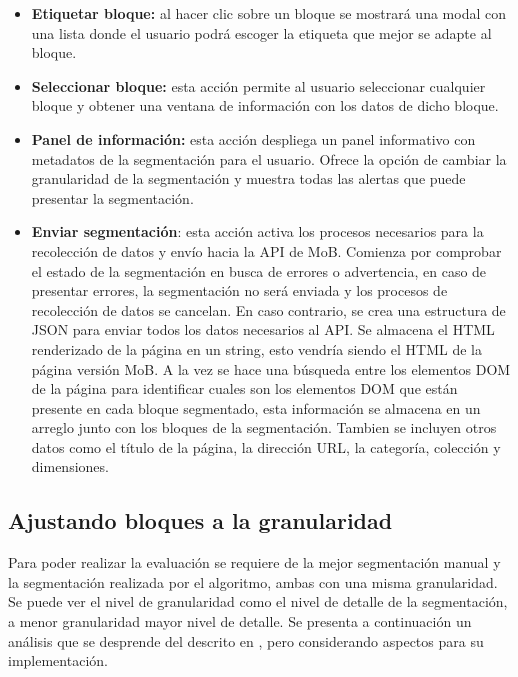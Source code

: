 \documentclass[10pt]{revecom}
\begin{document}
\begin{itemize}
\item \textbf{Etiquetar bloque:} al hacer clic sobre un bloque se mostrará una modal con una lista donde el usuario podrá escoger la etiqueta que mejor se adapte al bloque.
\item \textbf{Seleccionar bloque:} esta acción permite al usuario seleccionar cualquier bloque y obtener una ventana de información con los datos de dicho bloque.
\item \textbf{Panel de información:} esta acción despliega un panel informativo con metadatos de la segmentación para el usuario. Ofrece la opción de cambiar la granularidad de la segmentación y muestra todas las alertas que puede presentar la segmentación.
\item \textbf{Enviar segmentación}: esta acción activa los procesos necesarios para la recolección de datos y envío hacia la API de MoB. Comienza por comprobar el estado de la segmentación en busca de errores o advertencia, en caso de presentar errores, la segmentación no será enviada y los procesos de recolección de datos se cancelan. 
En caso contrario, se crea una estructura de JSON para enviar todos los datos necesarios al API. Se almacena el HTML renderizado de la página en un string, esto vendría siendo el HTML de la página versión MoB. A la vez se hace una búsqueda entre los elementos DOM de la página para identificar cuales son los elementos DOM que están presente en cada bloque segmentado, esta información se almacena en un arreglo junto con los bloques de la segmentación. Tambien se incluyen otros datos como el título de la página, la dirección URL, la categoría, colección y dimensiones. 
\end{itemize}

\subsection{Ajustando bloques a la granularidad}

Para poder realizar la evaluación se requiere de la mejor segmentación manual y la segmentación realizada por el algoritmo, ambas con una misma granularidad. 
Se puede ver el nivel de granularidad como el nivel de detalle de la segmentación, a menor granularidad mayor nivel de detalle. 
Se presenta a continuación un análisis que se desprende del descrito en \cite{Sanoja:LIP6:2015}, pero considerando aspectos para su implementación.
\end{document}
